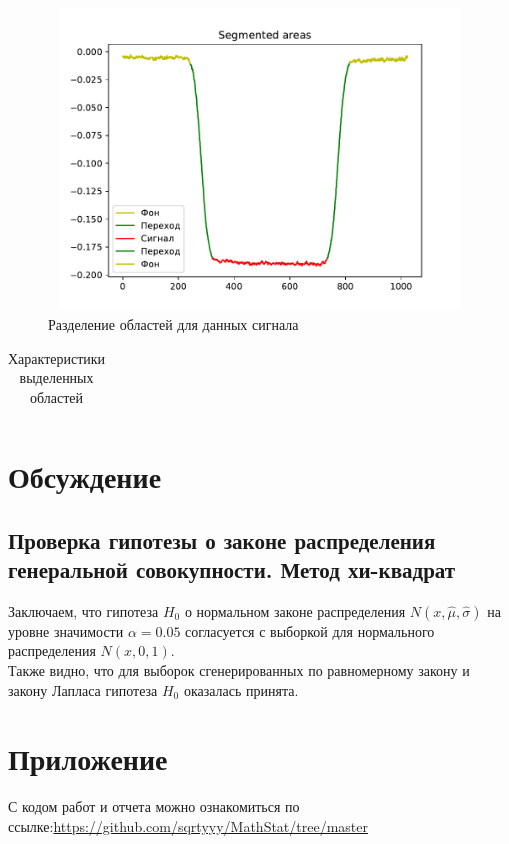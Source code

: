 \documentclass[a4paper]{article}
\begin{document}
	\begin{figure}[H]
		\centering
		\includegraphics[width = 13cm, height = 8cm]{src_lab_8/Segmented500}
		\caption{Разделение областей для данных сигнала}
		\label{fig:signalSegmented}
	\end{figure}
	\begin{table}[H]
    \centering
    \begin{tabular}{|c|c|c|c|}
    	\hline
        
    \end{tabular}
    \caption{Характеристики выделенных областей}
    \label{tab:FisherTab}
\end{table}
\section{Обсуждение}
\subsection{Проверка гипотезы о законе распределения генеральной совокупности. Метод хи-квадрат}

\noindent Заключаем, что гипотеза $H_{0}$ о нормальном законе распределения $N(x,\hat{\mu}, \hat{\sigma})$ на уровне значимости $\alpha = 0.05$ согласуется с выборкой для нормального распределения $N(x, 0, 1)$.
\\
Также видно, что для выборок сгенерированных по равномерному закону и закону Лапласа гипотеза $H_{0}$ оказалась принята.

\section{Приложение}
    С кодом работ и отчета можно ознакомиться по ссылке:\;\url{https://github.com/sqrtyyy/MathStat/tree/master}
\end{document}
